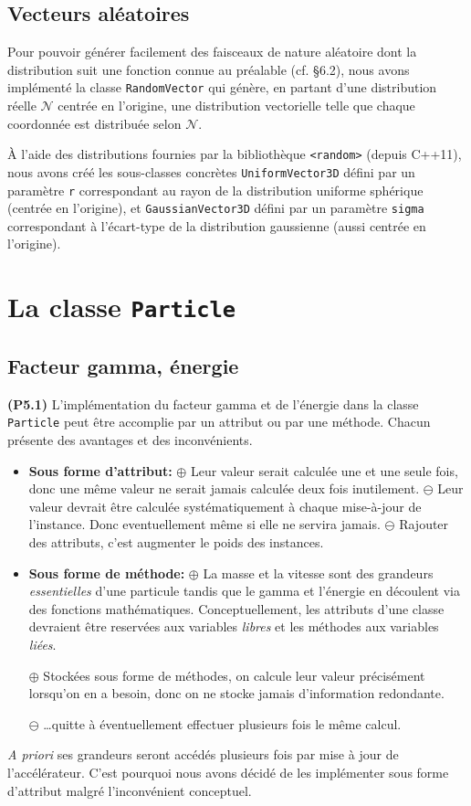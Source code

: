 \documentclass[12pt, letterpaper, twoside]{article}
\newcommand{\T}[1]{\texttt{#1}}
\begin{document}
\subsection{Vecteurs aléatoires}
\noindent Pour pouvoir générer facilement des faisceaux de nature aléatoire dont la distribution suit une fonction connue au préalable (cf. \S 6.2), nous avons implémenté la classe \T{RandomVector} qui génère, en partant d'une distribution réelle $\mathcal{N}$ centrée en l'origine, une distribution vectorielle telle que chaque coordonnée est distribuée selon $\mathcal{N}$.

À l'aide des distributions fournies par la bibliothèque \T{<random>} (depuis C++11), nous avons créé les sous-classes concrètes \T{UniformVector3D} défini par un paramètre \T{r} correspondant au rayon de la distribution uniforme sphérique (centrée en l'origine), et \T{GaussianVector3D} défini par un paramètre \T{sigma} correspondant à l'écart-type de la distribution gaussienne (aussi centrée en l'origine).
\section{La classe \T{Particle}}

\subsection{Facteur gamma, énergie}
\noindent \textbf{(P5.1)}
L'implémentation du facteur gamma et de l'énergie dans la classe \T{Particle} peut être accomplie par un attribut ou par une méthode. Chacun présente des avantages et des inconvénients.

\begin{itemize}

\item \textbf{Sous forme d'attribut:}
\subitem $\oplus$ Leur valeur serait calculée une et une seule fois, donc une même valeur ne serait jamais calculée deux fois inutilement.
\subitem $\ominus$ Leur valeur devrait être calculée systématiquement à chaque mise-à-jour de l'instance. Donc eventuellement même si elle ne servira jamais.
\subitem $\ominus$ Rajouter des attributs, c'est augmenter le poids des instances.

\item \textbf{Sous forme de méthode:}
\subitem $\oplus$ La masse et la vitesse sont des grandeurs \textit{essentielles} d'une particule tandis que le gamma et l'énergie en découlent via des fonctions mathématiques. Conceptuellement, les attributs d'une classe devraient être reservées aux variables \textit{libres} et les méthodes aux variables \textit{liées}.

\subitem $\oplus$ Stockées sous forme de méthodes, on calcule leur valeur précisément lorsqu'on en a besoin, donc on ne stocke jamais d'information redondante.

\subitem $\ominus$ \ldots quitte à éventuellement effectuer plusieurs fois le même calcul.
\end{itemize}
\bigskip
\textit{A priori} ses grandeurs seront accédés plusieurs fois par mise à jour de l'accélérateur. C'est pourquoi nous avons décidé de les implémenter sous forme d'attribut malgré l'inconvénient conceptuel.
\end{document}
